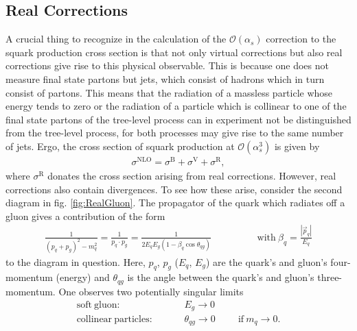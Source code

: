 \subsection{Real Corrections}
A crucial thing to recognize in the calculation of the $\mathcal{O}(\alpha_s)$ correction to the squark production cross section is that not only virtual corrections but also real corrections give rise to this physical observable. This is because one does not measure final state partons but jets, which consist of hadrons which in turn consist of partons. This means that the radiation of a massless particle whose energy tends to zero or the radiation of a particle which is collinear to one of the final state partons of the tree-level process can in experiment not be distinguished from the tree-level process, for both processes may give rise to the same number of jets. Ergo, the cross section of squark production at $\mathcal{O}(\alpha_s^3)$ is given by
\begin{align}
\sigma^{\mathrm{NLO}} = \sigma^{\mathrm{B}} + \sigma^{\mathrm{V}} + \sigma^{\mathrm{R}},
\end{align}
where $\sigma^{\mathrm{R}}$ donates the cross section arising from real corrections. However, real corrections also contain divergences. To see how these arise, consider the second diagram in fig. \ref{fig:RealGluon}. The propagator of the quark which radiates off a gluon gives a contribution of the form
\begin{align}
\frac{1}{(p_q + p_g)^2 - m_q^2} = \frac{1}{p_q \cdot p_g} = \frac{1}{2E_qE_g(1-\beta_q \cos \theta_{qg})} \hspace{2cm} \mathrm{with}\ \beta_q = \frac{|\vec{p}_q|}{E_q}
\end{align}
to the diagram in question. Here, $p_q$, $p_g$ ($E_q$, $E_g$) are the quark's and gluon's four-momentum (energy) and $\theta_{qg}$ is the angle between the quark's and gluon's three-momentum. One observes two potentially singular limits
\begin{align}
\mathrm{soft\ gluon:}& \hspace{1cm} E_g \to 0\\
\mathrm{collinear\ particles:}& \hspace{1cm} \theta_{qg} \to 0 \hspace{1cm} \mathrm{if}\ m_q \to 0.\label{eq:collLimit}
\end{align}
